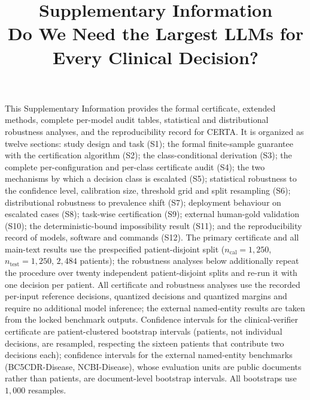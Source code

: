 \documentclass[11pt]{article}
\title{\vspace{-3em}\textbf{Supplementary Information}\\[0.3em]
\large Do We Need the Largest LLMs for Every Clinical Decision?}
\author{}
\date{}
\theoremstyle{plain}
\begin{document}
\maketitle
\vspace{-3em}

\noindent This Supplementary Information provides the formal certificate, extended methods, complete
per-model audit tables, statistical and distributional robustness analyses, and the reproducibility
record for CERTA. It is organized as twelve sections: study design and task (S1); the formal
finite-sample guarantee with the certification algorithm (S2); the class-conditional derivation (S3);
the complete per-configuration and per-class certificate audit (S4); the two mechanisms by which a
decision class is escalated (S5); statistical robustness to the confidence level, calibration size,
threshold grid and split resampling (S6); distributional robustness to prevalence shift (S7);
deployment behaviour on escalated cases (S8); task-wise certification (S9); external human-gold
validation (S10); the deterministic-bound impossibility result (S11); and the reproducibility record of
models, software and commands (S12). The primary certificate and all main-text results use the
prespecified patient-disjoint split ($n_{\mathrm{cal}}=1{,}250$, $n_{\mathrm{test}}=1{,}250$,
$2{,}484$ patients); the robustness analyses below additionally repeat the procedure over twenty
independent patient-disjoint splits and re-run it with one decision per patient. All certificate and
robustness analyses use the recorded per-input reference decisions, quantized decisions and quantized
margins and require no additional model inference; the external named-entity results are taken from the
locked benchmark outputs. Confidence intervals for the clinical-verifier certificate are
patient-clustered bootstrap intervals (patients, not individual decisions, are resampled, respecting the
sixteen patients that contribute two decisions each); confidence intervals for the external
named-entity benchmarks (BC5CDR-Disease, NCBI-Disease), whose evaluation units are public documents
rather than patients, are document-level bootstrap intervals. All bootstraps use $1{,}000$ resamples.

\vspace{0.6em}
\noindent{}
\end{document}
